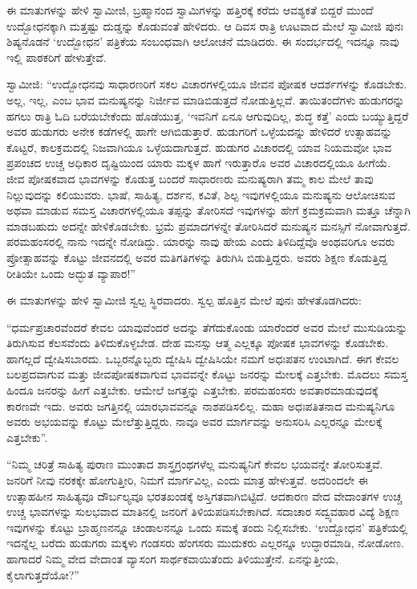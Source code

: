  ಈ ಮಾತುಗಳನ್ನು ಹೇಳಿ ಸ್ವಾಮೀಜಿ, ಬ್ರಹ್ಮಾನಂದ ಸ್ವಾಮಿಗಳನ್ನು ಹತ್ತಿರಕ್ಕೆ ಕರೆದು ಆವಶ್ಯಕತೆ ಬಿದ್ದರೆ ಮುಂದೆ ಉದ್ಬೋಧನಕ್ಕಾಗಿ ಮತ್ತಷ್ಟು ದುಡ್ಡನ್ನು ಕೊಡುವಂತೆ ಹೇಳಿದರು. ಆ ದಿವಸ ರಾತ್ರಿ ಊಟವಾದ ಮೇಲೆ ಸ್ವಾಮೀಜಿ ಪುನಃ ಶಿಷ್ಯನೊಡನೆ ‘ಉದ್ಬೋಧನ’ ಪತ್ರಿಕೆಯ ಸಂಬಂಧವಾಗಿ ಆಲೋಚನೆ ಮಾಡಿದರು. ಈ ಸಂದರ್ಭದಲ್ಲಿ ಇದನ್ನೂ ನಾವು ಇಲ್ಲಿ ಪಾಠಕರಿಗೆ ಹೇಳುತ್ತೇವೆ. 

 ಸ್ವಾಮೀಜಿ: “ಉದ್ಬೋಧನವು ಸಾಧಾರಣರಿಗೆ ಸಕಲ ವಿಚಾರಗಳಲ್ಲಿಯೂ ಜೀವನ ಪೋಷಕ ಆದರ್ಶಗಳನ್ನು ಕೊಡಬೇಕು. ಅಲ್ಲ, ಇಲ್ಲ, ಎಂಬ ಭಾವ ಮನುಷ್ಯನನ್ನು ನಿರ್ಜೀವ ಮಾಡಿಬಿಡುತ್ತದೆ ನೋಡುತ್ತಿಲ್ಲವೆ. ತಾಯಿತಂದೆಗಳು ಹುಡುಗರನ್ನು ಹಗಲು ರಾತ್ರಿ ಓದಿ ಬರೆಯಬೇಕೆಂದು ಹೊಡೆಯುತ್ತ, ‘ಇವನಿಗೆ ಏನೂ ಆಗುವುದಿಲ್ಲ, ಶುದ್ಧ ಕತ್ತೆ’ ಎಂದು ಬಯ್ಯುತ್ತಿದ್ದರೆ ಅವರ ಹುಡುಗರು ಅನೇಕ ಕಡೆಗಳಲ್ಲಿ ಹಾಗೇ ಆಗಿಬಿಡುತ್ತಾರೆ. ಹುಡುಗರಿಗೆ ಒಳ್ಳೆಯದನ್ನು ಹೇಳಿದರೆ ಉತ್ಸಾಹವನ್ನು ಕೊಟ್ಟರೆ, ಕಾಲಕ್ರಮದಲ್ಲಿ ನಿಜವಾಗಿಯೂ ಒಳ್ಳೆಯದಾಗುತ್ತದೆ. ಹುಡುಗರ ವಿಚಾರದಲ್ಲಿ ಯಾವ ನಿಯಮವೋ ಭಾವ ಪ್ರಪಂಚದ ಉಚ್ಚ ಅಧಿಕಾರ ದೃಷ್ಟಿಯಿಂದ ಯಾರು ಮಕ್ಕಳ ಹಾಗೆ ಇರುತ್ತಾರೊ ಅವರ ವಿಚಾರದಲ್ಲಿಯೂ ಹೀಗೆಯೆ. ಜೀವ ಪೋಷಕವಾದ ಭಾವಗಳನ್ನು ಕೊಡುತ್ತ ಬಂದರೆ ಸಾಧಾರಣರು ಮನುಷ್ಯರಾಗಿ ತಮ್ಮ ಕಾಲ ಮೇಲೆ ತಾವು ನಿಲ್ಲುವುದನ್ನು ಕಲಿಯುವರು. ಭಾಷೆ, ಸಾಹಿತ್ಯ, ದರ್ಶನ, ಕವಿತೆ, ಶಿಲ್ಪ ಇವುಗಳಲ್ಲಿಯೂ ಮನುಷ್ಯನು ಆಲೋಚಿಸುವ ಅಥವಾ ಮಾಡುವ ಸಮಸ್ತ ವಿಚಾರಗಳಲ್ಲಿಯೂ ತಪ್ಪನ್ನು ತೋರಿಸದೆ ಇವುಗಳನ್ನು ಹೇಗೆ ಕ್ರಮಕ್ರಮವಾಗಿ ಮತ್ತೂ ಚೆನ್ನಾಗಿ ಮಾಡಬಹುದು ಅದನ್ನೇ ಹೇಳಿಕೊಡಬೇಕು. ಭ್ರಮೆ ಪ್ರಮಾದಗಳನ್ನೇ ತೋರಿಸಿದರೆ ಮನುಷ್ಯನ ಮನಸ್ಸಿಗೆ ನೋವಾಗುತ್ತದೆ. ಪರಮಹಂಸರಲ್ಲಿ ನಾನು ಇದನ್ನೇ ನೋಡಿದ್ದು. ಯಾರನ್ನು ನಾವು ಹೇಯ ಎಂದು ತಿಳಿದಿದ್ದೆವೊ ಅಂಥವರಿಗೂ ಅವರು ಪ್ರೋತ್ಸಾಹವನ್ನು ಕೊಟ್ಟು ಜೀವನದಲ್ಲಿ ಅವರ ಮತಿಗತಿಗಳನ್ನು ತಿರುಗಿಸಿ ಬಿಡುತ್ತಿದ್ದರು. ಅವರು ಶಿಕ್ಷಣ ಕೊಡುತ್ತಿದ್ದ ರೀತಿಯೇ ಒಂದು ಅದ್ಭುತ ವ್ಯಾಪಾರ!” 

 ಈ ಮಾತುಗಳನ್ನು ಹೇಳಿ ಸ್ವಾಮೀಜಿ ಸ್ವಲ್ಪ ಸ್ಥಿರವಾದರು. ಸ್ವಲ್ಪ ಹೊತ್ತಿನ ಮೇಲೆ ಪುನಃ ಹೇಳತೊಡಗಿದರು: 

 “ಧರ್ಮಪ್ರಚಾರವೆಂದರೆ ಕೇವಲ ಯಾವುವೆಂದರೆ ಅದನ್ನು ತೆಗೆದುಕೊಂಡು ಯಾರೆಂದರೆ ಅವರ ಮೇಲೆ ಮುಸುಡಿಯನ್ನು ತಿರುಗಿಸುವ ಕೆಲಸವೆಂದು ತಿಳಿದುಕೊಳ್ಳಬೇಡ. ದೇಹ ಮನಸ್ಸು ಆತ್ಮ ಎಲ್ಲಕ್ಕೂ ಪೋಷಕ ಭಾವಗಳನ್ನು ಕೊಡಬೇಕು. ಹಾಗಲ್ಲದೆ ದ್ವೇಷಿಸಬಾರದು. ಒಬ್ಬರನ್ನೊಬ್ಬರು ದ್ವೇಷಿಸಿ ದ್ವೇಷಿಸಿಯೇ ನಮಗೆ ಅಧಃಪತನ ಉಂಟಾಗಿದೆ. ಈಗ ಕೇವಲ ಬಲಪ್ರದವಾಗುವ ಮತ್ತು ಜೀವಪೋಷಕವಾಗುವ ಭಾವವನ್ನೇ ಕೊಟ್ಟು ಜನರನ್ನು ಮೇಲಕ್ಕೆ ಎತ್ತಬೇಕು. ಮೊದಲು ಸಮಸ್ತ ಹಿಂದೂ ಜನರನ್ನು ಹೀಗೆ ಎತ್ತಬೇಕು. ಆಮೇಲೆ ಜಗತ್ತನ್ನು ಎತ್ತಬೇಕು. ಪರಮಹಂಸರು ಅವತಾರಮಾಡುವುದಕ್ಕೆ ಕಾರಣವೇ ಇದು. ಅವರು ಜಗತ್ತಿನಲ್ಲಿ ಯಾರಭಾವವನ್ನೂ ನಾಶಪಡಿಸಲಿಲ್ಲ. ಮಹಾ ಅಧಃಪತಿತನಾದ ಮನುಷ್ಯನಿಗೂ ಅವರು ಅಭಯವನ್ನು ಕೊಟ್ಟು ಮೇಲೆತ್ತುತ್ತಿದ್ದರು. ನಾವೂ ಅವರ ಮಾರ್ಗವನ್ನು ಅನುಸರಿಸಿ ಎಲ್ಲರನ್ನೂ ಮೇಲಕ್ಕೆ ಎತ್ತಬೇಕು”. 

 “ನಿಮ್ಮ ಚರಿತ್ರೆ ಸಾಹಿತ್ಯ ಪುರಾಣ ಮುಂತಾದ ಶಾಸ್ತ್ರಗ್ರಂಥಗಳೆಲ್ಲ ಮನುಷ್ಯನಿಗೆ ಕೇವಲ ಭಯವನ್ನೇ ತೋರಿಸುತ್ತವೆ. ಜನರಿಗೆ ನೀವು ನರಕಕ್ಕೇ ಹೋಗುತ್ತೀರಿ, ನಿಮಗೆ ಮಾರ್ಗವಿಲ್ಲ, ಎಂದು ಮಾತ್ರ ಹೇಳುತ್ತವೆ. ಅದರಿಂದಲೇ ಈ ಉತ್ಸಾಹಹೀನ ಸಾಹಿತ್ಯವೂ ದೌರ್ಬಲ್ಯವೂ ಭರತಖಂಡಕ್ಕೆ ಅಸ್ತಿಗತವಾಗಿಬಿಟ್ಟಿದೆ. ಆದಕಾರಣ ವೇದ ವೇದಾಂತಗಳ ಉಚ್ಚ ಉಚ್ಚ ಭಾವಗಳನ್ನು ಸುಲಭವಾದ ಮಾತಿನಲ್ಲಿ ಜನರಿಗೆ ತಿಳಿಯಪಡಿಸಬೇಕಾಗಿದೆ. ಸದಾಚಾರ ಸದ್ವ್ಯವಹಾರ ವಿದ್ಯೆ ಶಿಕ್ಷಣ ಇವುಗಳನ್ನು ಕೊಟ್ಟು ಬ್ರಾಹ್ಮಣನನ್ನೂ ಚಂಡಾಲನನ್ನೂ ಒಂದು ಸಮಕ್ಕೆ ತಂದು ನಿಲ್ಲಿಸಬೇಕು. ‘ಉದ್ಬೋಧನ' ಪತ್ರಿಕೆಯಲ್ಲಿ ಇದನ್ನೆಲ್ಲ ಬರೆದು ಹುಡುಗರು ಮಕ್ಕಳು ಗಂಡಸರು ಹೆಂಗಸರು ಮುದುಕರು ಎಲ್ಲರನ್ನೂ ಉದ್ಧಾರಮಾಡಿ, ನೋಡೋಣ. ಹಾಗಾದರೆ ನಿಮ್ಮ ವೇದ ವೇದಾಂತ ವ್ಯಾಸಂಗ ಸಾರ್ಥಕವಾಯಿತೆಂದು ತಿಳಿಯುತ್ತೇನೆ. ಏನನ್ನುತ್ತೀಯ, ಕೈಲಾಗುತ್ತದೆಯೋ?” 

